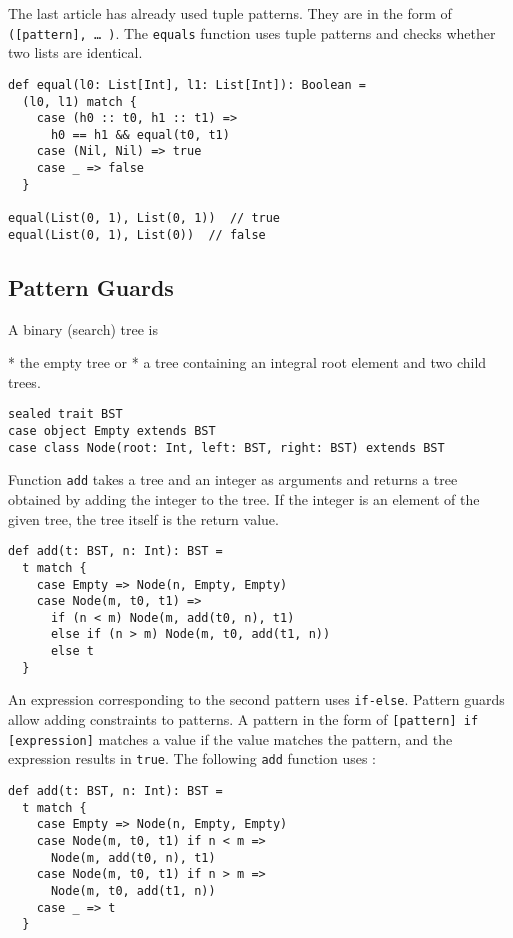 The last article has already used tuple patterns. They are in the form of
\verb!([pattern], … )!. The \verb!equals! function uses tuple patterns and checks
whether two lists are identical.

\begin{verbatim}
def equal(l0: List[Int], l1: List[Int]): Boolean =
  (l0, l1) match {
    case (h0 :: t0, h1 :: t1) =>
      h0 == h1 && equal(t0, t1)
    case (Nil, Nil) => true
    case _ => false
  }

equal(List(0, 1), List(0, 1))  // true
equal(List(0, 1), List(0))  // false
\end{verbatim}

\subsection{Pattern Guards}

A binary (search) tree is

* the empty tree or
* a tree containing an integral root element and two child trees.

\begin{verbatim}
sealed trait BST
case object Empty extends BST
case class Node(root: Int, left: BST, right: BST) extends BST
\end{verbatim}

Function \verb!add! takes a tree and an integer as arguments and returns a tree
obtained by adding the integer to the tree. If the integer is an element of the
given tree, the tree itself is the return value.

\begin{verbatim}
def add(t: BST, n: Int): BST =
  t match {
    case Empty => Node(n, Empty, Empty)
    case Node(m, t0, t1) =>
      if (n < m) Node(m, add(t0, n), t1)
      else if (n > m) Node(m, t0, add(t1, n))
      else t
  }
\end{verbatim}

An expression corresponding to the second pattern uses \verb!if-else!. Pattern
guards allow adding constraints to patterns. A pattern in the form of
\verb![pattern] if [expression]! matches a value if the value matches the
pattern, and the expression results in \verb!true!. The following \verb!add!
function uses  :

\begin{verbatim}
def add(t: BST, n: Int): BST =
  t match {
    case Empty => Node(n, Empty, Empty)
    case Node(m, t0, t1) if n < m =>
      Node(m, add(t0, n), t1)
    case Node(m, t0, t1) if n > m =>
      Node(m, t0, add(t1, n))
    case _ => t
  }
\end{verbatim}

